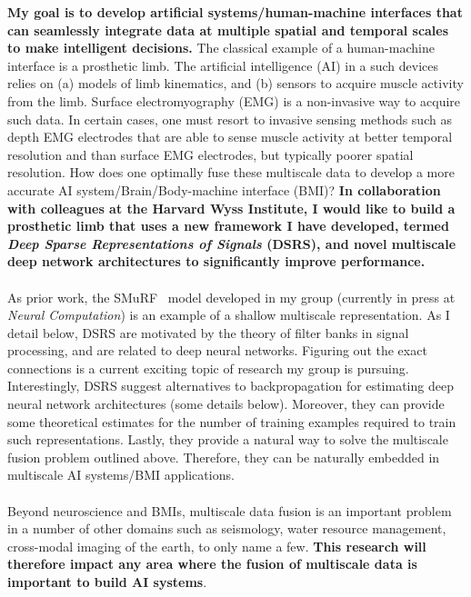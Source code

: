 \documentclass[12pt]{article}
\begin{document}
\textbf{My goal is to develop artificial systems/human-machine interfaces that can seamlessly integrate data at multiple spatial and temporal scales to make intelligent decisions.} %
The classical example of a human-machine interface is a prosthetic limb. The artificial intelligence (AI) in a such devices relies on (a) models of limb kinematics, and (b) sensors to acquire muscle activity from the limb. Surface electromyography (EMG) is a non-invasive way to acquire such data. In certain cases, one must resort to invasive sensing methods such as depth EMG electrodes that are able to sense muscle activity at better temporal resolution and than surface EMG electrodes, but typically poorer spatial resolution. How does one optimally fuse these multiscale data to develop a more accurate AI system/Brain/Body-machine interface (BMI)? \textbf{In collaboration with colleagues at the Harvard Wyss Institute, I would like to build a prosthetic limb that uses a new framework I have developed, termed \emph{Deep Sparse Representations of Signals} (DSRS), and novel multiscale deep network architectures to significantly improve performance.} %
\\
\\
As prior work, the SMuRF~\cite{smurf2017} model developed in my group (currently in press at \emph{Neural Computation}) is an example of a shallow multiscale representation. As I detail below, DSRS are motivated by the theory of filter banks in signal processing, and are related to deep neural networks. Figuring out the exact connections is a current exciting topic of research my group is pursuing. Interestingly, DSRS suggest alternatives to backpropagation for estimating deep neural network architectures (some details below). Moreover, they can provide some theoretical estimates for the number of training examples required to train such representations. Lastly, they provide a natural way to solve the multiscale fusion problem outlined above. Therefore, they can be naturally embedded in multiscale AI systems/BMI applications. 
\\
\\
Beyond neuroscience and BMIs, multiscale data fusion is an important problem in a number of other domains such as seismology, water resource management, cross-modal imaging of the earth, to only name a few. \textbf{This research will therefore impact any area where the fusion of multiscale data is important to build AI systems}.
\end{document}
